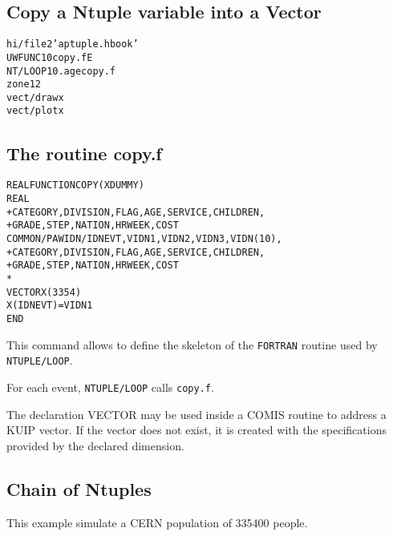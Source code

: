\clearpage

\subsection{Copy a Ntuple variable into a Vector}

\begin{alltt}
      hi/file 2 'aptuple.hbook'
     UWFUNC 10 copy.f E
     NT/LOOP 10.age copy.f
      zone 1 2
      vect/draw x
      vect/plot x
\end{alltt} 
\subsection*{The routine copy.f}
\begin{alltt}
      REAL FUNCTION COPY(XDUMMY)
      REAL
     +CATEGORY,DIVISION,FLAG    ,AGE     ,SERVICE ,CHILDREN,
     +GRADE   ,STEP    ,NATION  ,HRWEEK  ,COST     
      COMMON/PAWIDN/IDNEVT,VIDN1,VIDN2,VIDN3,VIDN(10),
     +CATEGORY,DIVISION,FLAG    ,AGE     ,SERVICE ,CHILDREN,
     +GRADE   ,STEP    ,NATION  ,HRWEEK  ,COST     
*
     VECTOR X(3354)
      X(IDNEVT)=VIDN1
      END
\end{alltt} 
\begin{DinglistE}
\item This command allows to define the skeleton of the {\tt FORTRAN}
      routine used by {\tt NTUPLE/LOOP}.
\item For each event, {\tt NTUPLE/LOOP} calls {\tt copy.f}.
\item The declaration VECTOR may be used inside a COMIS routine to
      address a KUIP vector. If the vector does not exist, it is 
      created with the specifications provided by the declared dimension.
\end{DinglistE}

\clearpage

\subsection{Chain of Ntuples}

This example simulate a CERN population of 335400 people.

